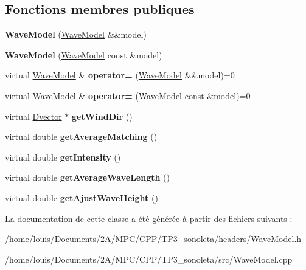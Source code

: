 \subsection*{Fonctions membres publiques}
\begin{DoxyCompactItemize}
\item 
\mbox{\label{class_wave_model_a22d9989890929f0418fcf7f1bd1fe489}} 
{\bfseries Wave\+Model} (\hyperlink{class_wave_model}{Wave\+Model} \&\&model)
\item 
\mbox{\label{class_wave_model_a1991dab09a570054adffc3677e218556}} 
{\bfseries Wave\+Model} (\hyperlink{class_wave_model}{Wave\+Model} const \&model)
\item 
\mbox{\label{class_wave_model_a3b52480b59f4c5f3d0d749d400f9e14c}} 
virtual \hyperlink{class_wave_model}{Wave\+Model} \& {\bfseries operator=} (\hyperlink{class_wave_model}{Wave\+Model} \&\&model)=0
\item 
\mbox{\label{class_wave_model_a3794a5af00e6f216009fd8b54d48caf3}} 
virtual \hyperlink{class_wave_model}{Wave\+Model} \& {\bfseries operator=} (\hyperlink{class_wave_model}{Wave\+Model} const \&model)=0
\item 
\mbox{\label{class_wave_model_abe94f9621e5aaca300d8312479051710}} 
virtual \hyperlink{class_dvector}{Dvector} $\ast$ {\bfseries get\+Wind\+Dir} ()
\item 
\mbox{\label{class_wave_model_a829250f96303b3e9ddd9c2c6cbb0e3be}} 
virtual double {\bfseries get\+Average\+Matching} ()
\item 
\mbox{\label{class_wave_model_ab72286fdfe57cebaae70af46c69dacb1}} 
virtual double {\bfseries get\+Intensity} ()
\item 
\mbox{\label{class_wave_model_af73c7bfe6c6c2d1546e7aaa966879ca3}} 
virtual double {\bfseries get\+Average\+Wave\+Length} ()
\item 
\mbox{\label{class_wave_model_a6ce936ce9c4d27170bd0f7a6cd28b31f}} 
virtual double {\bfseries get\+Ajust\+Wave\+Height} ()
\end{DoxyCompactItemize}


La documentation de cette classe a été générée à partir des fichiers suivants \+:\begin{DoxyCompactItemize}
\item 
/home/louis/\+Documents/2\+A/\+M\+P\+C/\+C\+P\+P/\+T\+P3\+\_\+sonoleta/headers/Wave\+Model.\+h\item 
/home/louis/\+Documents/2\+A/\+M\+P\+C/\+C\+P\+P/\+T\+P3\+\_\+sonoleta/src/Wave\+Model.\+cpp\end{DoxyCompactItemize}
